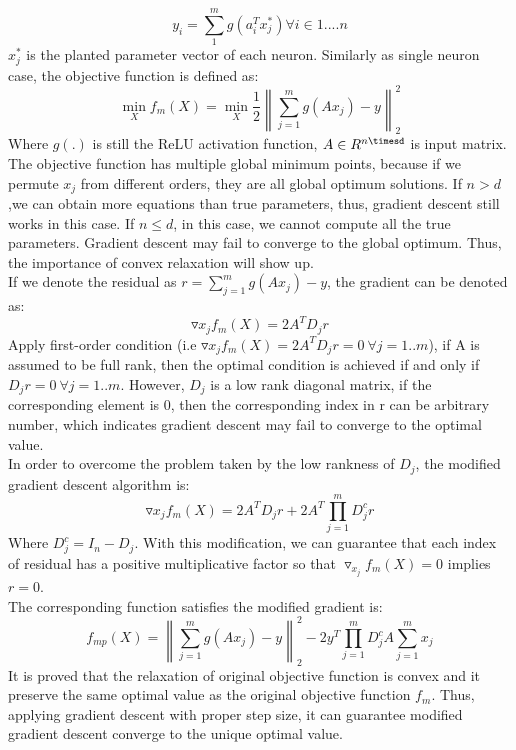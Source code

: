\documentclass{article}
\begin{document}
\begin{equation}
    y_i=\sum_{1}^{m}g(a_i^Tx_j^*) \forall{i\in 1....n}
\end{equation}
$x_j^*$ is the planted parameter vector of each neuron. Similarly as single neuron case, the objective function is defined as:
\begin{equation}
    \min_Xf_m(X)=\min_X \frac{1}{2}\left \| \sum_{j=1}^{m}g(Ax_j)-y \right \|_2^2
\end{equation}
Where $g(.)$ is still the ReLU activation function, $A\in R^{n\timesd}$ is input matrix.\\
The objective function has multiple global minimum points, because if we permute $x_j$ from different orders, they are all global optimum solutions. If $n > d$,we can obtain more equations than true parameters, thus, gradient descent still works in this case. If $n \leq d$, in this case, we cannot compute all the true parameters. Gradient descent may fail to converge to the global optimum. Thus, the importance of convex relaxation will show up.\\
If we denote the residual as $r=\sum_{j=1}^{m}g(Ax_j)-y$, the gradient can be denoted as:
\begin{equation}
    \triangledown {x_j} f_m(X)=2A^TD_jr
\end{equation}
Apply first-order condition (i.e $\triangledown {x_j} f_m(X)=2A^TD_jr=0\ \forall j=1..m$), if A is assumed to be full rank, then the optimal condition is achieved if and only if $D_jr=0\ \forall j=1..m$. However, $D_j$ is a low rank diagonal matrix, if the corresponding element is 0, then the corresponding index in r can be arbitrary number, which indicates gradient descent may fail to converge to the optimal value.\\
In order to overcome the problem taken by the low rankness of $D_j$, the modified gradient descent algorithm is:
\begin{equation}
    \triangledown {x_j} f_m(X)=2A^TD_jr+2A^T\prod_{j=1}^{m}D_j^cr
\end{equation}
Where $D_j^c=I_n-D_j$. With this modification, we can guarantee that each index of residual has a positive multiplicative factor so that $\triangledown_{x_j} f_m(X)=0$ implies $r=0$.\\
The corresponding function satisfies the modified gradient is:
\begin{equation}
    f_{mp}(X)=\left \| \sum_{j=1}^{m}g(Ax_j)-y \right \|_2^2-2y^T\prod_{j=1}^{m}D^c_jA\sum_{j=1}^{m}x_j
\end{equation}
It is proved that the relaxation of original objective function is convex \cite{cvxrelxation} and it preserve the same optimal value as the original objective function $f_m$. Thus, applying gradient descent with proper step size, it can guarantee modified gradient descent converge to the unique optimal value. 
\end{document}
